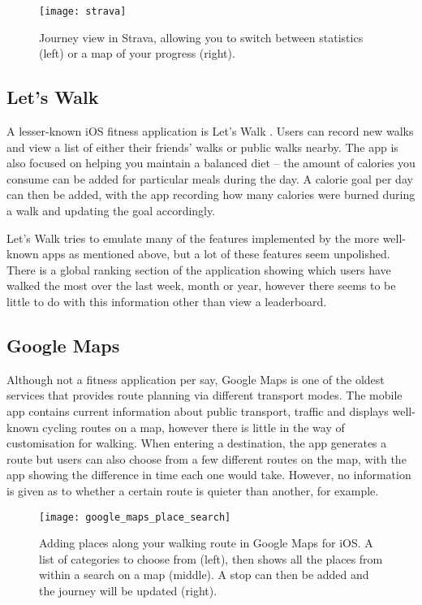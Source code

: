 \begin{figure}[hbt]
  \centering
  \texttt{[image: strava]}
  \caption{Journey view in Strava, allowing you to switch between statistics (left) or a map of your progress (right).}
  \label{fig:strava}
\end{figure}


\subsection{Let's Walk}

A lesser-known iOS fitness application is Let's Walk \cite{LetsWalkApp}. Users can record new walks and view a list of either their friends' walks or public walks nearby. The app is also focused on helping you maintain a balanced diet -- the amount of calories you consume can be added for particular meals during the day. A calorie goal per day can then be added, with the app recording how many calories were burned during a walk and updating the goal accordingly.

Let's Walk tries to emulate many of the features implemented by the more well-known apps as mentioned above, but a lot of these features seem unpolished. There is a global ranking section of the application showing which users have walked the most over the last week, month or year, however there seems to be little to do with this information other than view a leaderboard.



\subsection{Google Maps}

Although not a fitness application per say, Google Maps \cite{GoogleInc.} is one of the oldest services that provides route planning via different transport modes. The mobile app contains current information about public transport, traffic and displays well-known cycling routes on a map, however there is little in the way of customisation for walking. When entering a destination, the app generates a route but users can also choose from a few different routes on the map, with the app showing the difference in time each one would take. However, no information is given as to whether a certain route is quieter than another, for example.

\begin{figure}[hbt]
  \centering
  \texttt{[image: google\_maps\_place\_search]}
  \caption{Adding places along your walking route in Google Maps for iOS. A list of categories to choose from (left), then shows all the places from within a search on a map (middle). A stop can then be added and the journey will be updated (right).}
  \label{fig:google_maps_place_search}
\end{figure}


